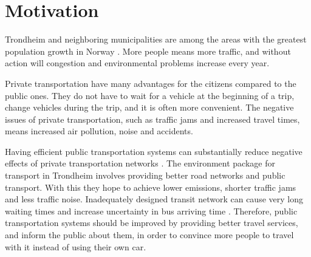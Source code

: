 \section{Motivation}

Trondheim and neighboring municipalities are among the areas with the greatest population growth in Norway \citep{website:miljopakken}. More people means more traffic, and without action will congestion and environmental problems increase every year. 

Private transportation have many advantages for the citizens compared to the public ones. They do not have to wait for a vehicle at the beginning of a trip, change vehicles during the trip, and it is often more convenient. The negative issues of private transportation, such as traffic jams and increased travel times, means increased air pollution, noise and accidents. 

Having efficient public transportation systems can substantially reduce negative effects of private transportation networks 
\citep{kechagiopoulos13} . The environment package \citep{website:miljopakken} for transport in Trondheim involves providing better road networks and public transport. With this they hope to achieve lower emissions, shorter traffic jams and less traffic noise. Inadequately designed transit network can cause very long waiting times and increase uncertainty in bus arriving time \citep{nikolic14}. Therefore, public transportation systems should be improved by providing better travel services, and inform the public about them, in order to convince more people to travel with it instead of using their own car. 


